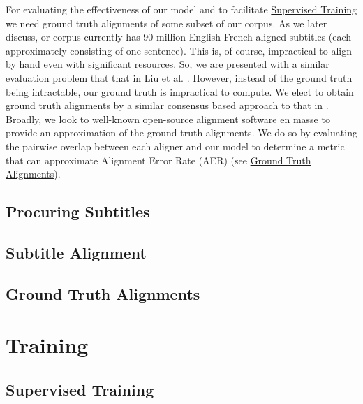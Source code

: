 \documentclass[twoside,twocolumn]{article}
\begin{document}
For evaluating the effectiveness of our model and to facilitate
\hyperref[sec:supervised-training]{Supervised Training} we need ground truth
alignments of some subset of our corpus. As we later discuss, or corpus
currently has 90 million English-French aligned subtitles (each approximately
consisting of one sentence). This is, of course, impractical to align by hand
even with significant resources. So, we are presented with a similar evaluation
problem that that in Liu et al. \cite{liu2015streaming}. However, instead of
the ground truth being intractable, our ground truth is impractical to compute.
We elect to obtain ground truth alignments by a similar consensus based
approach to that in \cite{liu2015streaming}. Broadly, we look to well-known
open-source alignment software en masse to provide an approximation of the
ground truth alignments. We do so by evaluating the pairwise overlap between
each aligner and our model to determine a metric that can approximate
Alignment Error Rate (AER) (see
\hyperref[subsec:ground-truth-alignments]{Ground Truth Alignments}).


\subsection{Procuring Subtitles}
\label{subsec:procuring-subtitles}



\subsection{Subtitle Alignment}
\label{subsec:subtitle-alignment}



\subsection{Ground Truth Alignments}
\label{subsec:ground-truth-alignments}



\section{Training}



\subsection{Supervised Training}
\label{sec:supervised-training}
\end{document}
